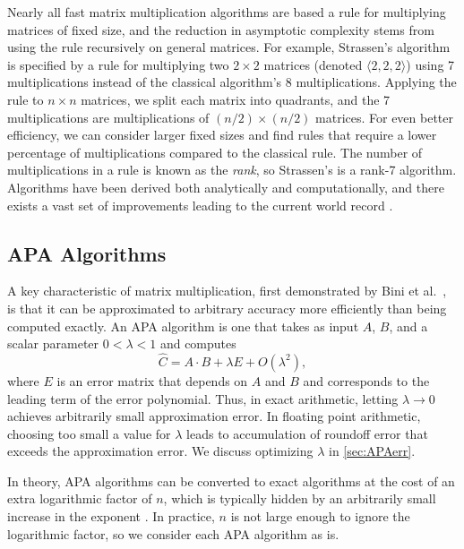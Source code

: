 \documentclass[conference]{IEEEtran}
\newcommand{\dims}[1]{\langle #1 \rangle}
\begin{document}
Nearly all fast matrix multiplication algorithms are based a rule for multiplying matrices of fixed size, and the reduction in asymptotic complexity stems from using the rule recursively on general matrices.
For example, Strassen's algorithm is specified by a rule for multiplying two $2\times2$ matrices (denoted $\dims{2,2,2}$) using 7 multiplications instead of the classical algorithm's 8 multiplications.
Applying the rule to $n\times n$ matrices, we split each matrix into quadrants, and the 7 multiplications are multiplications of $(n/2)\times (n/2)$ matrices.
For even better efficiency, we can consider larger fixed sizes and find rules that require a lower percentage of multiplications compared to the classical rule.
The number of multiplications in a rule is known as the \emph{rank}, so Strassen's is a rank-7 algorithm.
Algorithms have been derived both analytically and computationally, and there exists a vast set of improvements leading to the current world record \cite{Pan84,CW87,Williams12,AW21}.

\subsection{APA Algorithms}
\label{sec:APAalgs}

A key characteristic of matrix multiplication, first demonstrated by Bini et al.~\cite{BCRL79}, is that it can be approximated to arbitrary accuracy more efficiently than being computed exactly.
An APA algorithm is one that takes as input $A$, $B$, and a scalar parameter $0<\lambda<1$ and computes 
\begin{equation}
\label{eq:APAapprox}
\hat C = A\cdot B + \lambda E + O(\lambda^2),
\end{equation}
where $E$ is an error matrix that depends on $A$ and $B$ and corresponds to the leading term of the error polynomial.
Thus, in exact arithmetic, letting $\lambda \rightarrow 0$ achieves arbitrarily small approximation error.
In floating point arithmetic, choosing too small a value for $\lambda$ leads to accumulation of roundoff error that exceeds the approximation error.
We discuss optimizing $\lambda$ in \cref{sec:APAerr}.

In theory, APA algorithms can be converted to exact algorithms at the cost of an extra logarithmic factor of $n$, which is typically hidden by an arbitrarily small increase in the exponent \cite{Bini80}.
In practice, $n$ is not large enough to ignore the logarithmic factor, so we consider each APA algorithm as is.
\end{document}
